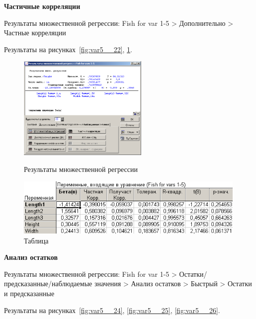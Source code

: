 \begin{center}
  \textbf{Частичные корреляции}
\end{center}

Результаты множественной регрессии: Fish for var 1-5 > Дополнительно > Частные корреляции

Результаты на рисунках~\ref{fig:var5__22}, \ref{fig:var5__23}.

\begin{figure}[!h]
  \centering
  \begin{minipage}{0.49\textwidth}
    \centering

    \includegraphics[height=5cm]
    {inc/var5__22.PNG}

    \caption{Результаты множественной регрессии}
    \label{fig:var5__22}
  \end{minipage}
  \begin{minipage}{0.49\textwidth}
    \centering

    \includegraphics[width=0.99\textwidth]
    {inc/var5__23.PNG}

    \caption{Таблица}
    \label{fig:var5__23}
  \end{minipage}
\end{figure}

\newpage

\begin{center}
  \textbf{Анализ остатков}
\end{center}

Результаты множественной регрессии: Fish for var 1-5 > Остатки/предсказанные/наблюдаемые значения > Анализ остатков > Быстрый > Остатки и предсказанные

Результаты на рисунках~\ref{fig:var5__24}, \ref{fig:var5__25}, \ref{fig:var5__26}.

